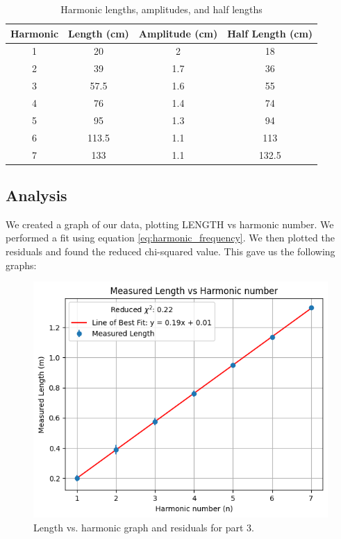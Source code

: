 \documentclass[11pt]{article}
\begin{document}
    \begin{table}[h]
        \centering
        \begin{tabular}{|c|c|c|c|}
        \hline
        \textbf{Harmonic} & \textbf{Length (cm)} & \textbf{Amplitude (cm)} & \textbf{Half Length (cm)} \\
        \hline
        1 & 20 & 2 & 18 \\
        2 & 39 & 1.7 & 36 \\
        3 & 57.5 & 1.6 & 55 \\
        4 & 76 & 1.4 & 74 \\
        5 & 95 & 1.3 & 94 \\
        6 & 113.5 & 1.1 & 113 \\
        7 & 133 & 1.1 & 132.5 \\
        \hline
        \end{tabular}
        \caption{Harmonic lengths, amplitudes, and half lengths}
        \label{tab:harmonic_lengths}
    \end{table}
    
    \subsection{Analysis}\label{subsec:part_3_analysis}
    We created a graph of our data, plotting LENGTH vs harmonic number.
    We performed a fit using equation \ref{eq:harmonic_frequency}.
    We then plotted the residuals and found the reduced chi-squared value.
    This gave us the following graphs:

    \begin{figure}[H]
        \includegraphics[width=1\textwidth]{resources/images/p3 graph}
        \caption{Length vs. harmonic graph and residuals for part 3.}
        \label{fig:measured_length}
    \end{figure}
\end{document}
